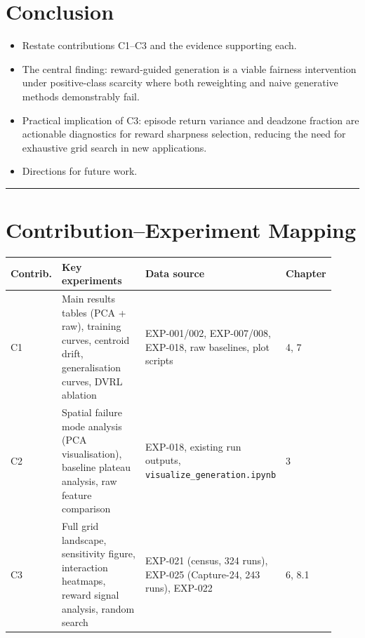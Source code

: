 \documentclass[12pt]{article}
\begin{document}
\section{Conclusion}

\begin{itemize}
    \item Restate contributions C1--C3 and the evidence supporting each.
    \item The central finding: reward-guided generation is a viable fairness
          intervention under positive-class scarcity where both reweighting
          and naive generative methods demonstrably fail.
    \item Practical implication of C3: episode return variance and deadzone
          fraction are actionable diagnostics for reward sharpness selection,
          reducing the need for exhaustive grid search in new applications.
    \item Directions for future work.
\end{itemize}

\vspace{1em}
\hrule
\vspace{1em}

\section*{Contribution--Experiment Mapping}

\begin{table}[h]
\centering
\renewcommand{\arraystretch}{1.3}
\begin{tabular}{p{0.08\linewidth} p{0.38\linewidth} p{0.38\linewidth} p{0.08\linewidth}}
\toprule
\textbf{Contrib.} & \textbf{Key experiments} & \textbf{Data source} & \textbf{Chapter} \\
\midrule
C1 & Main results tables (PCA + raw), training curves, centroid drift, generalisation curves, DVRL ablation & EXP-001/002, EXP-007/008, EXP-018, raw baselines, plot scripts & 4, 7 \\
\midrule
C2 & Spatial failure mode analysis (PCA visualisation), baseline plateau analysis, raw feature comparison & EXP-018, existing run outputs, \texttt{visualize\_generation.ipynb} & 3 \\
\midrule
C3 & Full grid landscape, sensitivity figure, interaction heatmaps, reward signal analysis, random search & EXP-021 (census, 324 runs), EXP-025 (Capture-24, 243 runs), EXP-022 & 6, 8.1 \\
\bottomrule
\end{tabular}
\end{table}
\end{document}
